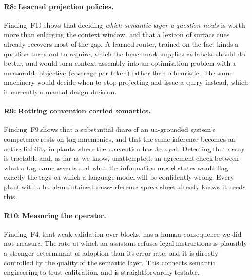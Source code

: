 \paragraph{R8: Learned projection policies.} Finding~F10 shows that deciding
\emph{which semantic layer a question needs} is worth more than enlarging the
context window, and that a lexicon of surface cues already recovers most of the
gap. A learned router, trained on the fact kinds a question turns out to
require, which the benchmark supplies as labels, should do better, and would
turn context assembly into an optimisation problem with a measurable objective
(coverage per token) rather than a heuristic. The same machinery would decide
when to stop projecting and issue a query instead, which is currently a manual
design decision.

\paragraph{R9: Retiring convention-carried semantics.} Finding~F9 shows that
a substantial share of an un-grounded system's competence rests on tag
mnemonics, and that the same inference becomes an active liability in plants
where the convention has decayed. Detecting that decay is tractable and, as far
as we know, unattempted: an agreement check between what a tag name asserts and
what the information model states would flag exactly the tags on which a
language model will be confidently wrong. Every plant with a hand-maintained
cross-reference spreadsheet already knows it needs this.

\paragraph{R10: Measuring the operator.} Finding~F4, that weak validation
over-blocks, has a human consequence we did not measure. The rate at which an
assistant refuses legal instructions is plausibly a stronger determinant of
adoption than its error rate, and it is directly controlled by the quality of the
semantic layer. This connects semantic engineering to trust calibration, and is
straightforwardly testable.
